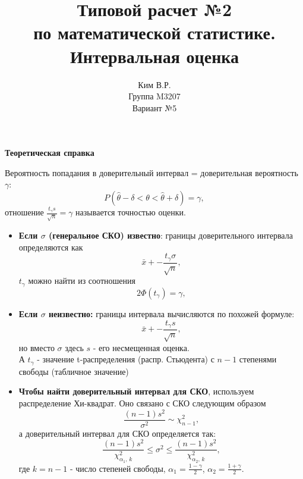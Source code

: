 \documentclass[a4paper,11pt]{article}
\title{Типовой расчет №2 \\ по математической статистике. \\ Интервальная оценка}
\author{Ким В.Р. \\ Группа M3207 \\ Вариант №5}
\date{}
\newenvironment{shdd}{\begin{mdframed}[backgroundcolor=shadecolor]}{\end{mdframed}}
\theoremstyle{definition}
\begin{document}
\maketitle

\begin{shdd}
    \textbf{Теоретическая справка}\par\setlength{\parindent}{0pt}
    Вероятность попадания в доверительный интервал = доверительная вероятность \(\gamma\):
    \[
    P(\hat{\theta} - \delta < \theta < \hat{\theta} + \delta) = \gamma,
    \]
    отношение \(\frac{t_{\gamma}s}{\sqrt{n}} = \gamma\) называется точностью оценки. 
    \begin{itemize}
        \item \textbf{Если \(\sigma\) (генеральное СКО) известно}:
        границы доверительного интервала определяются как
        \[
        \bar{x} +- \frac{t_{\gamma}\sigma}{\sqrt{n}},
        \]
        \(t_\gamma\) можно найти из соотношения 
        \[
        2\Phi(t_\gamma) = \gamma,
        \] 

        \item \textbf{Если \(\sigma\) неизвестно:}
        границы интервала вычисляются по похожей формуле:
        \[
        \bar{x} +- \frac{t_{\gamma}s}{\sqrt{n}},
        \]
        но вместо \(\sigma\) здесь \(s\) - его несмещенная оценка. 
        \\ А \(t_\gamma\) - значение t-распределения (распр. Стьюдента) с \(n-1\) степенями 
        свободы (табличное значение)

        \item  \textbf{Чтобы найти доверительный интервал для СКО}, используем распределение Хи-квадрат. 
        Оно связано с СКО следующим образом  
        \[
        \frac{(n-1)s^2}{\sigma^2}\sim\chi^2_{n-1},
        \]
        \newline а доверительный интервал для СКО определяется так:
        \[
        \frac{(n-1)s^2}{\chi^2_{\alpha_1, \, k}} \leq \sigma^2 \leq \frac{(n-1)s^2}{\chi^2_{\alpha_2, \, k}},
        \]
        где \(k=n-1\) - число степеней свободы, \(\alpha_1 = \frac{1-\gamma}{2}\), \(\alpha_2 = \frac{1+\gamma}{2}.\)
    \end{itemize}
\end{shdd}
\vspace{10pt}
\end{document}

